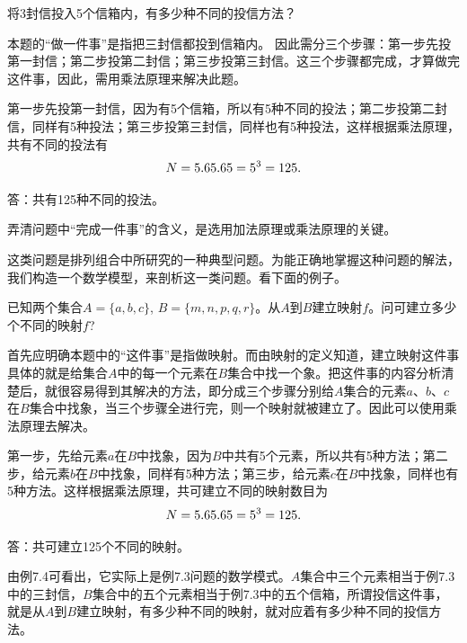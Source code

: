 \begin{example}
    将3封信投入5个信箱内，有多少种不同的投信方法？
\end{example}

\begin{analyze}
    本题的“做一件事”是指把三封信都投到信箱内。
因此需分三个步骤：第一步先投第一封信；第二步投第二封信；第三步投第三封信。这三个步骤都完成，才算做完这件事，因此，需用乘法原理来解决此题。
\end{analyze}

\begin{solution}
第一步先投第一封信，因为有5个信箱，所以有5种不同的投法；第二步投第二封信，同样有5种投法；第三步投第三封信，同样也有5种投法，这样根据乘法原理，共有不同的投法有
\[
N=5.6 5.6 5=5^{3}=125.\]

答：共有125种不同的投法。
\end{solution}

\begin{rmk}
    弄清问题中“完成一件事”的含义，是选用加法原理或乘法原理的关键。
\end{rmk}

这类问题是排列组合中所研究的一种典型问题。为能正确地掌握这种问题的解法，我们构造一个数学模型，来剖析这一类问题。看下面的例子。


\begin{example}
已知两个集合$A=\{a,b,c\}$, $ B=\{m,n,p,q,  r\}$。从$A$到$B$建立映射$f$。问可建立多少个不同的映射$f$?    
\end{example}

\begin{analyze}
首先应明确本题中的“这件事”是指做映射。而由映射的定义知道，建立映射这件事具体的就是给集合$A$中的每一个元素在$B$集合中找一个象。把这件事的内容分析清楚后，就很容易得到其解决的方法，即分成三个步骤分别给$A$集合的元素$a$、$b$、$c$在$B$集合中找象，当三个步骤全进行完，则一个映射就被建立了。因此可以使用乘法原理去解决。
\end{analyze}

\begin{solution}
    第一步，先给元素$a$在$B$中找象，因为$B$中共有5个元素，所以共有5种方法；第二步，给元素$b$在$B$中找象，同样有5种方法；第三步，给元素$c$在$B$中找象，同样也有5种方法。这样根据乘法原理，共可建立不同的映射数目为
\[N=5.6 5.6 5=5^{3}=125.\]

答：共可建立125个不同的映射。
\end{solution}

由例7.4可看出，它实际上是例7.3问题的数学模式。$A$集合中三个元素相当于例7.3中的三封信，$B$集合中的五个元素相当于例7.3中的五个信箱，所谓投信这件事，就是从$A$到$B$建立映射，有多少种不同的映射，就对应着有多少种不同的投信方法。

